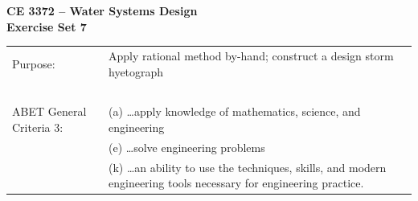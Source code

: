 \documentclass[12pt]{article}
\begin{document}
\begin{center}
{\textbf{{ CE 3372 -- Water Systems Design} \\ {Exercise Set 7}}}
\end{center}

\begingroup
\begin{tabular}{p{2in} p{4.5in}}
Purpose: & Apply rational method by-hand; construct a design storm hyetograph\\
~ & ~ \\
ABET General Criteria 3: & (a) \dots apply knowledge of mathematics, science, and engineering  \\
~ & (e)  \dots solve engineering problems  \\
~ & (k) \dots an ability to use the techniques, skills, and modern engineering tools necessary for engineering practice. \\
\end{tabular}
\endgroup
\end{document}
